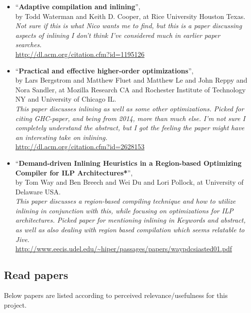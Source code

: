 \begin{itemize}
	\item ``\textbf{Adaptive compilation and inlining}'', \\ by Todd Waterman
and Keith D. Cooper, at Rice University Houston Texas. \\
\textit{Not sure if this is what Nico wants me to find, but this is a paper
discussing aspects of inlining I don't think I've considered much in earlier
paper searches.}\\
\url{http://dl.acm.org/citation.cfm?id=1195126}

	\item ``\textbf{Practical and effective higher-order optimizations}'', \\ by
Lars Bergstrom and Matthew Fluet and Matthew Le and John Reppy and Nora Sandler,
at Mozilla Research CA and Rochester Institute of Technology NY and University
of Chicago IL. \\
\textit{This paper discusses inlining as well as some other optimizations.
Picked for citing GHC-paper, and being from 2014, more than much else.
I'm not sure I completely understand the abstract, but I got the feeling the
paper might have an interesting take on inlining.} \\
\url{http://dl.acm.org/citation.cfm?id=2628153}

	\item ``\textbf{Demand-driven Inlining Heuristics in a Region-based
Optimizing Compiler for ILP Architectures*}'', \\ by Tom Way and Ben Breech and
Wei Du and Lori Pollock, at University of Delaware USA. \\
\textit{This paper discusses a region-based compiling technique and how to
utilize inlining in conjunction with this, while focusing on optimizations for
ILP architectures. Picked paper for mentioning inlining in Keywords and
abstract, as well as also dealing with region based compilation which seems
relatable to Jive.} \\
\url{http://www.eecis.udel.edu/~hiper/passages/papers/waypdcsiasted01.pdf}

\end{itemize}

\subsection{Read papers}

Below papers are listed according to perceived relevance/usefulness for this
project.\\

